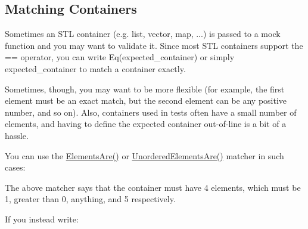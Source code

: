 \subsection*{Matching Containers}

Sometimes an S\+TL container (e.\+g. list, vector, map, ...) is passed to a mock function and you may want to validate it. Since most S\+TL containers support the {\ttfamily ==} operator, you can write {\ttfamily Eq(expected\+\_\+container)} or simply {\ttfamily expected\+\_\+container} to match a container exactly.

Sometimes, though, you may want to be more flexible (for example, the first element must be an exact match, but the second element can be any positive number, and so on). Also, containers used in tests often have a small number of elements, and having to define the expected container out-\/of-\/line is a bit of a hassle.

You can use the {\ttfamily \mbox{\hyperlink{namespacetesting_a79cf4ae694bf8231dcf283b325405f27}{Elements\+Are()}}} or {\ttfamily \mbox{\hyperlink{namespacetesting_a8622c12aadfa0e60f7d68683eeb21115}{Unordered\+Elements\+Are()}}} matcher in such cases\+:


\begin{DoxyCode}{0}
\DoxyCodeLine{}
\DoxyCodeLine{}
\end{DoxyCode}


The above matcher says that the container must have 4 elements, which must be 1, greater than 0, anything, and 5 respectively.

If you instead write\+:


